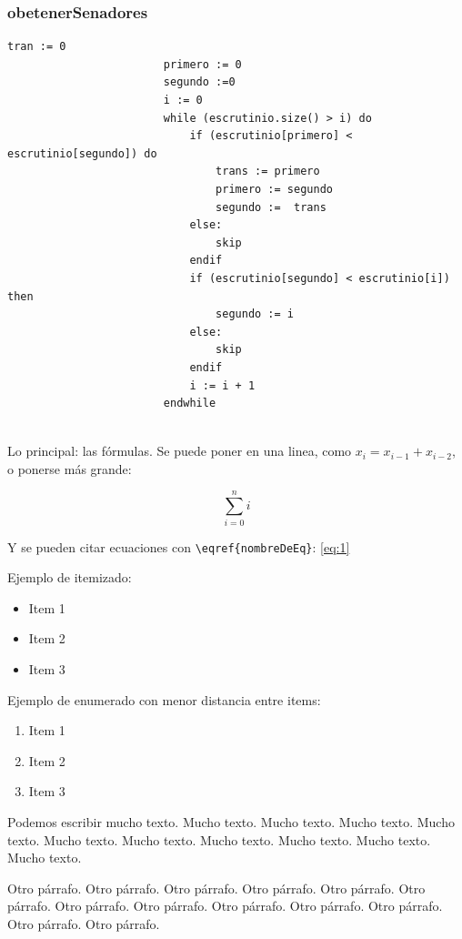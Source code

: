 \documentclass[10pt,a4paper]{article}
\begin{document}
		\subsubsection{obetenerSenadores}
			\begin{minipage}[t]{\textwidth}
				\begin{lstlisting}[caption={()},label=code:for]
						tran := 0
						primero := 0
						segundo :=0
						i := 0
						while (escrutinio.size() > i) do
							if (escrutinio[primero] < escrutinio[segundo]) do
								trans := primero
								primero := segundo
								segundo :=  trans
							else:
								skip
							endif
							if (escrutinio[segundo] < escrutinio[i]) then
								segundo := i
							else:
								skip
							endif
							i := i + 1
						endwhile
		
				\end{lstlisting}
			\end{minipage}








Lo principal: las fórmulas. Se puede poner en una linea, como $x_i = x_{i-1} + x_{i-2}$, o ponerse más grande:

\begin{equation}
	\sum\limits_{i=0}^{n} i
	\label{eq:1}
\end{equation}

Y se pueden citar ecuaciones con \verb|\eqref{nombreDeEq}|: \eqref{eq:1}

Ejemplo de itemizado:

\begin{itemize}
	\item Item 1
	\item Item 2
	\item Item 3
\end{itemize}

Ejemplo de enumerado con menor distancia entre items:

\begin{enumerate} \setlength\itemsep{0cm}
	\item Item 1
	\item Item 2
	\item Item 3
\end{enumerate}

Podemos escribir mucho texto. Mucho texto. Mucho texto. Mucho texto. Mucho texto. Mucho texto. Mucho texto. Mucho texto. Mucho texto. Mucho texto. Mucho texto.

Otro párrafo. Otro párrafo. Otro párrafo. Otro párrafo. Otro párrafo. Otro párrafo. Otro párrafo. Otro párrafo. Otro párrafo. Otro párrafo. Otro párrafo. Otro párrafo. Otro párrafo.
\end{document}
